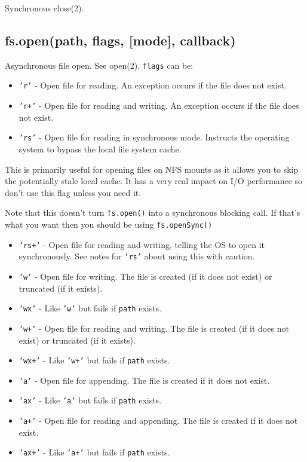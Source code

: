 Synchronous close(2).

\subsection{fs.open(path, flags, {[}mode{]}, callback)}

Asynchronous file open. See open(2). \texttt{flags} can be:

\begin{itemize}
\item
  \texttt{'r'} - Open file for reading. An exception occurs if the file
  does not exist.
\item
  \texttt{'r+'} - Open file for reading and writing. An exception occurs
  if the file does not exist.
\item
  \texttt{'rs'} - Open file for reading in synchronous mode. Instructs
  the operating system to bypass the local file system cache.
\end{itemize}

This is primarily useful for opening files on NFS mounts as it allows
you to skip the potentially stale local cache. It has a very real impact
on I/O performance so don't use this flag unless you need it.

Note that this doesn't turn \texttt{fs.open()} into a synchronous
blocking call. If that's what you want then you should be using
\texttt{fs.openSync()}

\begin{itemize}
\item
  \texttt{'rs+'} - Open file for reading and writing, telling the OS to
  open it synchronously. See notes for \texttt{'rs'} about using this
  with caution.
\item
  \texttt{'w'} - Open file for writing. The file is created (if it does
  not exist) or truncated (if it exists).
\item
  \texttt{'wx'} - Like \texttt{'w'} but fails if \texttt{path} exists.
\item
  \texttt{'w+'} - Open file for reading and writing. The file is created
  (if it does not exist) or truncated (if it exists).
\item
  \texttt{'wx+'} - Like \texttt{'w+'} but fails if \texttt{path} exists.
\item
  \texttt{'a'} - Open file for appending. The file is created if it does
  not exist.
\item
  \texttt{'ax'} - Like \texttt{'a'} but fails if \texttt{path} exists.
\item
  \texttt{'a+'} - Open file for reading and appending. The file is
  created if it does not exist.
\item
  \texttt{'ax+'} - Like \texttt{'a+'} but fails if \texttt{path} exists.
\end{itemize}

